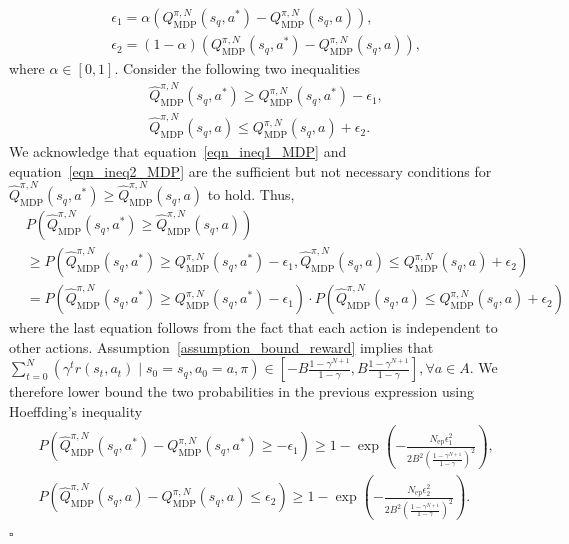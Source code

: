 \documentclass[10pt]{article}
\def\eqref#1{equation~\ref{#1}}
\newenvironment{myproof}{{\noindent\it Proof. }}{\hfill $\square$ \par}
\begin{document}
\begin{myproof}
\begin{align}
    &\epsilon_1 = \alpha \left( Q_\text{MDP}^{\pi, N}(s_q, a^*) - Q_\text{MDP}^{\pi, N}(s_q, a) \right), \\
    &\epsilon_2 = (1 - \alpha) \left( Q_\text{MDP}^{\pi, N}(s_q, a^*) - Q_\text{MDP}^{\pi, N}(s_q, a) \right),
\end{align}
where $\alpha \in [0, 1]$. Consider the following two inequalities
\begin{align}
    &\hat{Q}_\text{MDP}^{\pi, N}(s_q, a^*) \geq Q_\text{MDP}^{\pi, N}(s_q, a^*) - \epsilon_1 \label{eqn_ineq1_MDP}, \\
    &\hat{Q}_\text{MDP}^{\pi, N}(s_q, a) \leq Q_\text{MDP}^{\pi, N}(s_q, a) + \epsilon_2 \label{eqn_ineq2_MDP}.
\end{align}
We acknowledge that \eqref{eqn_ineq1_MDP} and \eqref{eqn_ineq2_MDP} are the sufficient but not necessary conditions for $\hat{Q}_\text{MDP}^{\pi, N}(s_q, a^*) \geq \hat{Q}_\text{MDP}^{\pi, N}(s_q, a)$ to hold.
Thus,
\begin{align}
    &P \left( \hat{Q}_\text{MDP}^{\pi, N}(s_q, a^*) \geq \hat{Q}_\text{MDP}^{\pi, N}(s_q, a) \right)  \\
    &\geq P\left( \hat{Q}_\text{MDP}^{\pi, N}(s_q, a^*) \geq Q_\text{MDP}^{\pi, N}(s_q, a^*) - \epsilon_1, \hat{Q}_\text{MDP}^{\pi, N}(s_q, a) \leq Q_\text{MDP}^{\pi, N}(s_q, a) + \epsilon_2 \right) \\
    &=P\left( \hat{Q}_\text{MDP}^{\pi, N}(s_q, a^*) \geq Q_\text{MDP}^{\pi, N}(s_q, a^*) - \epsilon_1 \right) \cdot P \left( \hat{Q}_\text{MDP}^{\pi, N}(s_q, a) \leq Q_\text{MDP}^{\pi, N}(s_q, a) + \epsilon_2 \right)
\end{align}
where the last equation follows from the fact that each action is independent to other actions.
Assumption~\ref{assumption_bound_reward} implies that $ \sum_{t=0}^{N} \left( \gamma^t r(s_t, a_t) \mid s_0=s_q, a_0=a, \pi \right) \in [-B \frac{1-\gamma^{N+1}}{1-\gamma}, B \frac{1-\gamma^{N+1}}{1-\gamma}], \forall a \in A$. We therefore lower bound the two probabilities in the previous expression using Hoeffding’s inequality~\citep{hoeffding1994probability}
\begin{align}
    &P\left( \hat{Q}_\text{MDP}^{\pi, N}(s_q, a^*) - Q_\text{MDP}^{\pi, N}(s_q, a^*) \geq - \epsilon_1 \right) \geq  1 - \exp \left( - \frac{N_\text{ep} \epsilon_1^2}{2B^2 \left( \frac{1-\gamma^{N+1}}{1-\gamma}\right)^2} \right), \\
    &P \left( \hat{Q}_\text{MDP}^{\pi, N}(s_q, a) - Q_\text{MDP}^{\pi, N}(s_q, a) \leq \epsilon_2 \right) \geq  1 - \exp \left( - \frac{N_\text{ep} \epsilon_2^2}{2B^2 \left( \frac{1-\gamma^{N+1}}{1-\gamma}\right)^2} \right).

\end{align}
\end{myproof}
\end{document}
